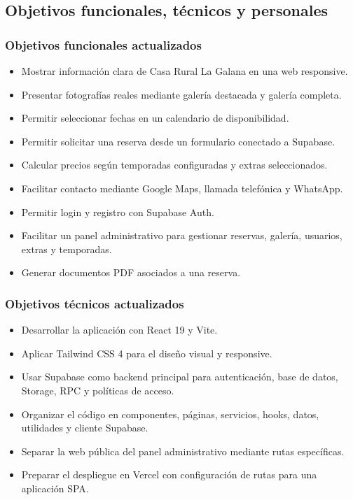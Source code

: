 \documentclass[11pt,a4paper]{article}
\begin{document}
\subsection{Objetivos funcionales, técnicos y personales}
\subsubsection*{Objetivos funcionales actualizados}
\begin{itemize}[leftmargin=1.4cm]
  \item Mostrar información clara de Casa Rural La Galana en una web responsive.
  \item Presentar fotografías reales mediante galería destacada y galería completa.
  \item Permitir seleccionar fechas en un calendario de disponibilidad.
  \item Permitir solicitar una reserva desde un formulario conectado a Supabase.
  \item Calcular precios según temporadas configuradas y extras seleccionados.
  \item Facilitar contacto mediante Google Maps, llamada telefónica y WhatsApp.
  \item Permitir login y registro con Supabase Auth.
  \item Facilitar un panel administrativo para gestionar reservas, galería, usuarios, extras y temporadas.
  \item Generar documentos PDF asociados a una reserva.
\end{itemize}

\subsubsection*{Objetivos técnicos actualizados}
\begin{itemize}[leftmargin=1.4cm]
  \item Desarrollar la aplicación con React 19 y Vite.
  \item Aplicar Tailwind CSS 4 para el diseño visual y responsive.
  \item Usar Supabase como backend principal para autenticación, base de datos, Storage, RPC y políticas de acceso.
  \item Organizar el código en componentes, páginas, servicios, hooks, datos, utilidades y cliente Supabase.
  \item Separar la web pública del panel administrativo mediante rutas específicas.
  \item Preparar el despliegue en Vercel con configuración de rutas para una aplicación SPA.
\end{itemize}
\end{document}
